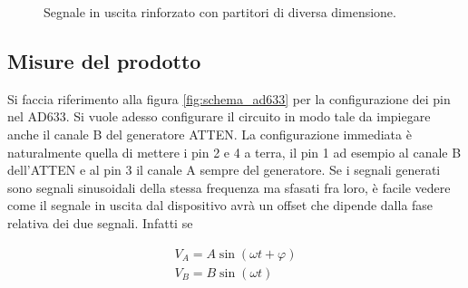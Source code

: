 \documentclass[10pt,letterpaper]{article}
\begin{document}
\begin{figure}
\centering
{}
{}

\caption{Segnale in uscita rinforzato con partitori di diversa dimensione.}
\label{fig:es20_sub}
\end{figure}

\subsection{Misure del prodotto}


Si faccia riferimento alla figura \ref{fig:schema_ad633} per la configurazione dei pin nel AD633. Si vuole adesso configurare il circuito in modo tale da impiegare anche il canale B del generatore ATTEN. La configurazione immediata è naturalmente quella di mettere i pin 2 e 4 a terra, il pin 1 ad esempio al canale B dell'ATTEN e al pin 3 il canale A sempre del generatore. Se i segnali generati sono segnali sinusoidali della stessa frequenza ma sfasati fra loro, è facile vedere come il segnale in uscita dal dispositivo avrà un offset che dipende dalla fase relativa dei due segnali. Infatti se

\begin{gather}
V_A = A \sin (\omega t + \varphi) \\
V_B = B \sin (\omega t)
\end{gather}
\end{document}
